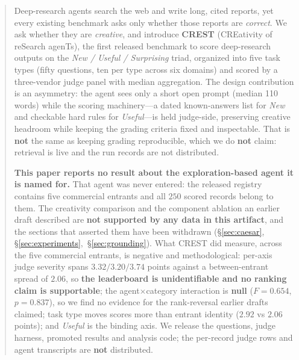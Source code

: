 \begin{abstract}
Deep-research agents search the web and write long, cited reports, yet every existing benchmark
asks only whether those reports are \emph{correct}. We ask whether they are \emph{creative}, and
introduce \textbf{CREST} (CREativity of reSearch agenTs), the first released benchmark to score
deep-research outputs on the \emph{New / Useful / Surprising} triad, organized into five task types
(fifty questions, ten per type across six domains) and scored by a three-vendor judge panel with
median aggregation. The design contribution is an asymmetry: the agent sees only a short open prompt
(median 110 words) while the scoring machinery---a dated known-answers list for \emph{New} and
checkable hard rules for \emph{Useful}---is held judge-side, preserving creative headroom while
keeping the grading criteria fixed and inspectable. That is
\textbf{not} the same as keeping grading reproducible, which we do \textbf{not} claim: retrieval is
live and the run records are not distributed.

\textbf{This paper reports no result about the exploration-based agent it is named for.} That agent
was never entered: the released registry contains five commercial entrants and all $250$ scored
records belong to them. The creativity comparison and the component ablation an earlier draft
described are \textbf{not supported by any data in this artifact}, and the sections that asserted
them have been withdrawn (\S\ref{sec:caesar}, \S\ref{sec:experiments},~\S\ref{sec:grounding}).
What CREST did measure, across the five commercial entrants, is negative and methodological:
per-axis judge severity spans $3.32/3.20/3.74$ points against a between-entrant spread of $2.06$,
so \textbf{the leaderboard is unidentifiable and no ranking claim is supportable}; the
agent$\times$category interaction is \textbf{null} ($F=0.654$, $p=0.837$), so we find no evidence
for the rank-reversal earlier drafts claimed; task type moves scores more than entrant identity
($2.92$ vs $2.06$ points); and \emph{Useful} is the binding axis. We release the questions, judge
harness, promoted results and analysis code; the per-record judge rows and agent transcripts are
\textbf{not} distributed.
\end{abstract}

